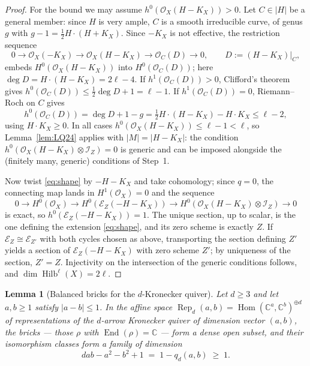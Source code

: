 \documentclass[10pt,a4paper]{amsart}
\newtheorem{lemma}[theorem]{Lemma}
\newcommand{\OO}{\mathcal{O}}
\newcommand{\EE}{\mathcal{E}}
\newcommand{\II}{\mathcal{I}}
\newcommand{\CC}{\mathbb{C}}
\newcommand{\Hilb}{\operatorname{Hilb}}
\newcommand{\Hom}{\operatorname{Hom}}
\newcommand{\End}{\operatorname{End}}
\newcommand{\Rep}{\operatorname{Rep}}
\newcommand{\len}{\ell}
\begin{document}
\begin{proof}
For the bound we may assume $h^0(\OO_X(H-K_X))>0$. Let $C\in|H|$ be a general member: since $H$ is very ample, $C$ is a smooth irreducible curve, of genus $g$ with $g-1=\tfrac12H\cdot(H+K_X)$. Since $-K_X$ is not effective, the restriction sequence
\[
0\to\OO_X(-K_X)\to\OO_X(H-K_X)\to\OO_C(D)\to0,\qquad D:=(H-K_X)|_C ,
\]
embeds $H^0(\OO_X(H-K_X))$ into $H^0(\OO_C(D))$; here $\deg D=H\cdot(H-K_X)=2\len-4$. If $h^1(\OO_C(D))>0$, Clifford's theorem gives $h^0(\OO_C(D))\le\tfrac12\deg D+1=\len-1$. If $h^1(\OO_C(D))=0$, Riemann--Roch on $C$ gives
\[
h^0(\OO_C(D))=\deg D+1-g=\tfrac12H\cdot(H-K_X)-H\cdot K_X\le\len-2 ,
\]
using $H\cdot K_X\ge0$. In all cases $h^0(\OO_X(H-K_X))\le\len-1<\len$, so Lemma~\ref{lem:LQ24} applies with $|M|=|H-K_X|$: the condition $h^0(\OO_X(H-K_X)\otimes\II_Z)=0$ is generic and can be imposed alongside the (finitely many, generic) conditions of Step~1.

Now twist \eqref{eq:shape} by $-H-K_X$ and take cohomology; since $q=0$, the connecting map lands in $H^1(\OO_X)=0$ and the sequence
\[
0\to H^0(\OO_X)\to H^0(\EE_Z(-H-K_X))\to H^0(\OO_X(H-K_X)\otimes\II_Z)\to 0
\]
is exact,
so $h^0(\EE_Z(-H-K_X))=1$. The unique section, up to scalar, is the one defining the extension \eqref{eq:shape}, and its zero scheme is exactly $Z$. If $\EE_Z\cong\EE_{Z'}$ with both cycles chosen as above, transporting the section defining $Z'$ yields a section of $\EE_Z(-H-K_X)$ with zero scheme $Z'$; by uniqueness of the section, $Z'=Z$. Injectivity on the intersection of the generic conditions follows, and $\dim\Hilb^{\len}(X)=2\len$.
\end{proof}

\begin{lemma}[Balanced bricks for the $d$-Kronecker quiver]\label{lem:bricks}
Let $d\ge3$ and let $a,b\ge1$ satisfy $|a-b|\le1$. In the affine space $\Rep_d(a,b)=\Hom(\CC^a,\CC^b)^{\oplus d}$ of representations of the $d$-arrow Kronecker quiver of dimension vector $(a,b)$, the bricks --- those $\rho$ with $\End(\rho)=\CC$ --- form a dense open subset, and their isomorphism classes form a family of dimension
\[
dab-a^2-b^2+1\;=\;1-q_d(a,b)\;\ge\;1 .
\]
\end{lemma}
\end{document}
